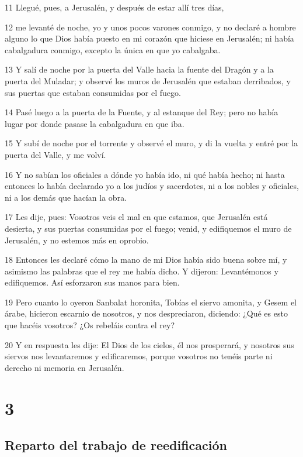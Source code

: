 \par 11 Llegué, pues, a Jerusalén, y después de estar allí tres días,
\par 12 me levanté de noche, yo y unos pocos varones conmigo, y no declaré a hombre alguno lo que Dios había puesto en mi corazón que hiciese en Jerusalén; ni había cabalgadura conmigo, excepto la única en que yo cabalgaba.
\par 13 Y salí de noche por la puerta del Valle hacia la fuente del Dragón y a la puerta del Muladar; y observé los muros de Jerusalén que estaban derribados, y sus puertas que estaban consumidas por el fuego.
\par 14 Pasé luego a la puerta de la Fuente, y al estanque del Rey; pero no había lugar por donde pasase la cabalgadura en que iba.
\par 15 Y subí de noche por el torrente y observé el muro, y di la vuelta y entré por la puerta del Valle, y me volví.
\par 16 Y no sabían los oficiales a dónde yo había ido, ni qué había hecho; ni hasta entonces lo había declarado yo a los judíos y sacerdotes, ni a los nobles y oficiales, ni a los demás que hacían la obra.
\par 17 Les dije, pues: Vosotros veis el mal en que estamos, que Jerusalén está desierta, y sus puertas consumidas por el fuego; venid, y edifiquemos el muro de Jerusalén, y no estemos más en oprobio.
\par 18 Entonces les declaré cómo la mano de mi Dios había sido buena sobre mí, y asimismo las palabras que el rey me había dicho. Y dijeron: Levantémonos y edifiquemos. Así esforzaron sus manos para bien. 
\par 19 Pero cuanto lo oyeron Sanbalat horonita, Tobías el siervo amonita, y Gesem el árabe, hicieron escarnio de nosotros, y nos despreciaron, diciendo: ¿Qué es esto que hacéis vosotros? ¿Os rebeláis contra el rey?
\par 20 Y en respuesta les dije: El Dios de los cielos, él nos prosperará, y nosotros sus siervos nos levantaremos y edificaremos, porque vosotros no tenéis parte ni derecho ni memoria en Jerusalén.

\chapter{3}

\section*{Reparto del trabajo de reedificación}


